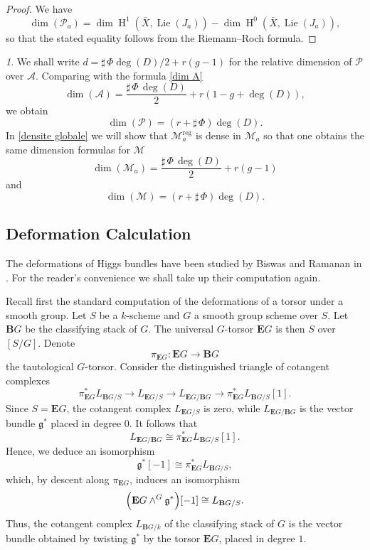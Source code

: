 \documentclass[12pt,english]{smfart}
\numberwithin{equation}{subsection}
\theoremstyle{remark}
\newtheorem{numero}[equation]{}
\newcommand\calA{{\mathscr A}}
\newcommand\calP{{\mathscr P}}
\begin{document}
\begin{proof}
We have
$$
\dim(\mathcal{P}_a)=\dim\operatorname{H}^1(\bar X,\operatorname{Lie}(J_a))-\dim\operatorname{H}^0(\bar X,\operatorname{Lie}(J_a)),
$$
so that the stated equality follows from the Riemann--Roch formula.
\end{proof}

\begin{numero}
We shall write $d=\sharp\,\Phi\deg(D)/2+r(g-1)$ for the relative dimension of $\calP$ over $\calA$. Comparing with the formula \ref{dim A}
$$
\dim(\mathcal{A})=\frac{\sharp\,\Phi\,\deg(D)}{2}+r(1-g+\deg(D)),
$$
we obtain
$$
\dim(\mathcal{P})=(r+\sharp\,\Phi)\deg(D).
$$
In \ref{densite globale} we will show that $\mathcal{M}_a^\mathrm{reg}$ is dense in $\mathcal{M}_a$ so that one obtains the same dimension formulas for $\mathcal{M}$
$$
\dim(\mathcal{M}_a)=\frac{\sharp\,\Phi\,\deg(D)}{2}+r(g-1)
$$
and
$$
\dim(\mathcal{M})=(r+\sharp\,\Phi)\deg(D).
$$
\end{numero}

\subsection{Deformation Calculation}\label{subsection : deformation}

The deformations of Higgs bundles have been studied by Biswas and Ramanan in \cite{BR}.
For the reader's convenience we shall take up their computation again.

Recall first the standard computation of the deformations of a torsor under a smooth group.
Let $S$ be a $k$-scheme and $G$ a smooth group scheme over $S$. Let $\mathbf{B}G$ be the classifying stack of $G$.
The universal $G$-torsor $\mathbf{E}G$ is then $S$ over $[S/G]$. Denote
$$
\pi_{\mathbf{E}G}:\mathbf{E}G\longrightarrow \mathbf{B}G
$$
the tautological $G$-torsor. Consider the distinguished triangle of cotangent complexes
$$
\pi_{\mathbf{E}G}^* L_{\mathbf{B}G/S}\longrightarrow L_{\mathbf{E}G/S}\longrightarrow L_{\mathbf{E}G/\mathbf{B}G}\longrightarrow \pi_{\mathbf{E}G}^* L_{\mathbf{B}G/S}[1].
$$
Since $S=\mathbf{E}G$, the cotangent complex $L_{\mathbf{E}G/S}$ is zero,
while $L_{\mathbf{E}G/\mathbf{B}G}$ is the vector bundle $\mathfrak{g}^*$ placed in degree $0$.
It follows that
$$
L_{\mathbf{E}G/\mathbf{B}G}\cong \pi_{\mathbf{E}G}^* L_{\mathbf{B}G/S}[1].
$$
Hence, we deduce an isomorphism
$$
\mathfrak{g}^*[-1]\cong \pi_{\mathbf{E}G}^* L_{\mathbf{B}G/S},
$$
which, by descent along $\pi_{\mathbf{E}G}$, induces an isomorphism
$$
\Bigl(\mathbf{E}G\wedge^G\mathfrak{g}^*\Bigr)[-1]\cong L_{\mathbf{B}G/S}.
$$
Thus, the cotangent complex $L_{\mathbf{B}G/k}$ of the classifying stack of $G$ is the vector bundle obtained
by twisting $\mathfrak{g}^*$ by the torsor $\mathbf{E}G$, placed in degree $1$.
\end{document}
